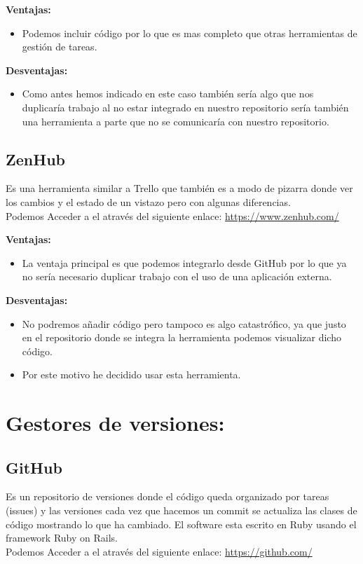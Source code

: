 \textbf{Ventajas:}

\begin{itemize}
\item Podemos incluir código por lo que es mas completo que otras herramientas de gestión de tareas.
\end{itemize}

\textbf{Desventajas:}

\begin{itemize}
\item Como antes hemos indicado en este caso también sería algo que nos duplicaría trabajo al no estar integrado en nuestro repositorio sería también una herramienta a parte que no se comunicaría con nuestro repositorio.
\end{itemize}


\subsection{ZenHub}
Es una herramienta similar a Trello que también es a modo de pizarra donde ver los cambios y el estado de un vistazo pero con algunas diferencias.\\
Podemos Acceder a el através del siguiente enlace: 
\url{https://www.zenhub.com/}



\textbf{Ventajas:}

\begin{itemize}
\item La ventaja principal es que podemos integrarlo desde GitHub por lo que ya no sería necesario duplicar trabajo con el uso de una aplicación externa.
\end{itemize}

\textbf{Desventajas:}

\begin{itemize}
\item No podremos añadir código pero tampoco es algo catastrófico, ya que justo en el repositorio donde se integra la herramienta podemos visualizar dicho código.

\item Por este motivo he decidido usar esta herramienta.
\end{itemize}

\section{Gestores de versiones:}
\subsection{GitHub}
Es un repositorio de versiones donde el código queda organizado por tareas (issues) y las versiones cada vez que hacemos un commit se actualiza las clases de código mostrando lo que ha cambiado.
El software esta escrito en Ruby usando el framework Ruby on Rails.\\
Podemos Acceder a el através del siguiente enlace: 
\url{https://github.com/}



